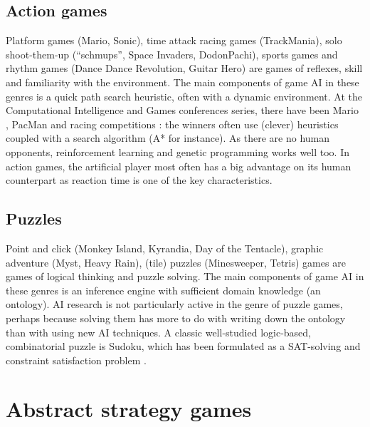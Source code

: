 \subsection{Action games}
Platform games (Mario, Sonic), time attack racing games (TrackMania), solo shoot-them-up (``schmups'', Space Invaders, DodonPachi), sports games and rhythm games (Dance Dance Revolution, Guitar Hero) are games of reflexes, skill and familiarity with the environment. The main components of game AI in these genres is a quick path search heuristic, often with a dynamic environment. At the Computational Intelligence and Games conferences series, there have been Mario \citep{TogeliusMario10}, PacMan \citep{PacManCEC11} and racing competitions \citep{CarRacingWCCI08}: the winners often use (clever) heuristics coupled with a search algorithm (A* for instance). As there are no human opponents, reinforcement learning and genetic programming works well too. In action games, the artificial player most often has a big advantage on its human counterpart as reaction time is one of the key characteristics.

\subsection{Puzzles}
Point and click (Monkey Island, Kyrandia, Day of the Tentacle), graphic adventure (Myst, Heavy Rain), (tile) puzzles (Minesweeper, Tetris) games are games of logical thinking and puzzle solving. The main components of game AI in these genres is an inference engine with sufficient domain knowledge (an ontology). AI research is not particularly active in the genre of puzzle games, perhaps because solving them has more to do with writing down the ontology than with using new AI techniques. A classic well-studied logic-based, combinatorial puzzle is Sudoku, which has been formulated as a SAT-solving \citep{lynce2006sudoku} and constraint satisfaction problem \citep{Simonis2005}.


\section{Abstract strategy games}
